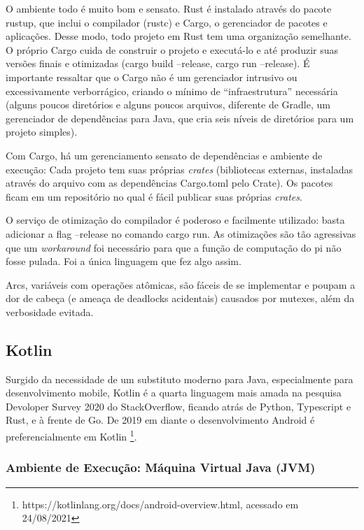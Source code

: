 \documentclass[12pt,a4paper]{article}
\begin{document}
O ambiente todo é muito bom e sensato. Rust é instalado através do pacote rustup, que inclui o compilador (rustc) e Cargo, o gerenciador de pacotes e aplicações. Desse modo, todo projeto em Rust tem uma organização semelhante. O próprio Cargo cuida de construir o projeto e executá-lo e até produzir suas versões finais e otimizadas (cargo build --release, cargo run --release). É importante ressaltar que o Cargo não é um gerenciador intrusivo ou excessivamente verborrágico, criando o mínimo de ``infraestrutura'' necessária (alguns poucos diretórios e alguns poucos arquivos, diferente de Gradle, um gerenciador de dependências para Java, que cria seis níveis de diretórios para um projeto simples).

Com Cargo, há um gerenciamento sensato de dependências e ambiente de execução: Cada projeto tem suas próprias \emph{crates} (bibliotecas externas, instaladas através do arquivo com as dependências Cargo.toml pelo Crate). Os pacotes ficam em um repositório no qual é fácil publicar suas próprias \emph{crates}.

O serviço de otimização do compilador é poderoso e facilmente utilizado: basta adicionar a flag --release no comando cargo run. As otimizações são tão agressivas que um \emph{workaround} foi necessário para que a função de computação do pi não fosse pulada. Foi a única linguagem que fez algo assim.

Arcs, variáveis com operações atômicas, são fáceis de se implementar e poupam a dor de cabeça (e ameaça de deadlocks acidentais) causados por mutexes, além da verbosidade evitada.

\subsection{Kotlin}
\label{ssec:kotlin}

Surgido da necessidade de um substituto moderno para Java, especialmente para desenvolvimento mobile, Kotlin é a quarta linguagem mais amada na pesquisa Devoloper Survey 2020 do StackOverflow, ficando atrás de Python, Typescript e Rust, e à frente de Go. De 2019 em diante o desenvolvimento Android é preferencialmente em Kotlin \footnote{https://kotlinlang.org/docs/android-overview.html, acessado em 24/08/2021}.

\subsubsection{Ambiente de Execução: Máquina Virtual Java (JVM)}
\label{sssec:kotlin ambiente execucao}
\end{document}
